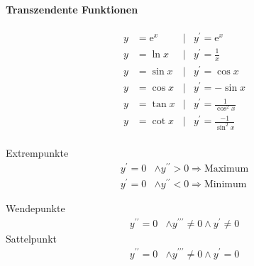 \paragraph{Transzendente Funktionen}
\begin{align*}
   y &= \mathrm{e}^x    &| &y^{\prime} = \mathrm{e}^x \\
   y &= \ln{x}          &| &y^{\prime} = \frac{1}{x} \\
   y &= \sin{x}         &| &y^{\prime} = \cos{x} \\
   y &= \cos{x}         &| &y^{\prime} = - \sin{x} \\
   y &= \tan{x}         &| &y^{\prime} = \frac{1}{\cos^2{x}} \\
   y &= \cot{x}         &| &y^{\prime} = \frac{-1}{\sin^2{x}} \\
\end{align*}

Extrempunkte
\begin{align*}
    y^{\prime}=0 &\land y^{\prime\prime} > 0  \Rightarrow  \textrm{Maximum} \\
    y^{\prime}=0 &\land y^{\prime\prime} < 0  \Rightarrow  \textrm{Minimum}
\end{align*}


Wendepunkte
\begin{align*}
    y^{\prime\prime}=0 &\land y^{\prime\prime\prime} \ne 0 \land y^{\prime} \ne 0
\end{align*}
Sattelpunkt
\begin{align*}
    y^{\prime\prime}=0 &\land y^{\prime\prime\prime} \ne 0 \land y^{\prime} = 0
\end{align*}




